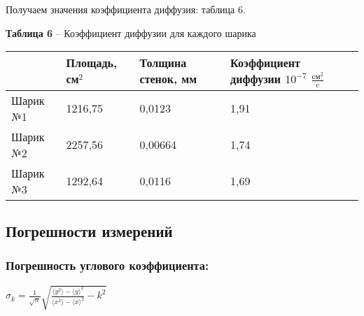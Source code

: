 \documentclass[12pt,a4paper]{article}
\begin{document}
        Получаем значения коэффициента диффузия: таблица 6.
       
        \begin{table}[!h]
        \begin{flushleft}
       		\hspace{10}\textbf{Таблица 6} -- Коэффициент диффузии для каждого шарика \\
        \end{flushleft}
            \begin{center}
                \begin{tabular}{ | l | l | l |  l |}
                \hline
                &   Площадь, см$^2$ &   Толщина стенок, мм  &   Коэффициент диффузии $10^{-7}$ $\frac{\text{см}^2}{\text{c}}$   \\
                \hline
                Шарик №1    &   1216,75   & 0,0123  &   1,91      \\
               \hline
                Шарик №2    &   2257,56   & 0,00664 &   1,74     \\
               \hline
                Шарик №3    &   1292,64   & 0,0116  &   1,69     \\
               \hline
               \end{tabular}
            \end{center}
        \end{table}
 
    \subsection{Погрешности измерений}
        \subsubsection{Погрешность углового коэффициента:}
       
            \begin{center}
                $\sigma_{k} = \frac{1}{\sqrt{n}}\sqrt{\frac{\langle y^2 \rangle - \langle y \rangle ^2}{\langle x^2 \rangle - \langle x \rangle ^2} - k^2}$
            \end{center}
               
\end{document}
